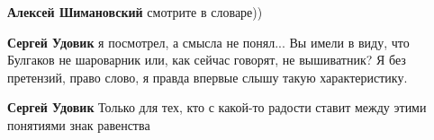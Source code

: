 \begin{itemize}
\begin{itemize}
\textbf{Алексей Шимановский} смотрите в словаре))

 
\textbf{Сергей Удовик} я посмотрел, а смысла не понял... Вы имели в виду, что Булгаков не шароварник или, как сейчас говорят, не вышиватник? Я без претензий, право слово, я правда впервые слышу такую характеристику.

 
\textbf{Сергей Удовик} Только для тех, кто с какой-то радости ставит между этими понятиями знак равенства
\end{itemize}

\end{itemize}

